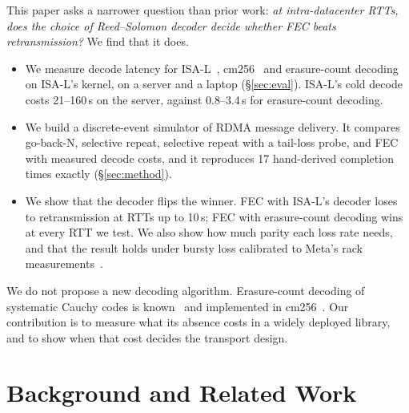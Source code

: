 \documentclass[10pt,twocolumn]{article}
\begin{document}
This paper asks a narrower question than prior work: \emph{at intra-datacenter RTTs, does the choice
of Reed--Solomon decoder decide whether FEC beats retransmission?} We find that it does.
\begin{itemize}
  \item We measure decode latency for ISA-L~\cite{isal}, cm256~\cite{cm256} and erasure-count
        decoding~\cite{li2005patent,samsung2015cauchy} on ISA-L's kernel, on a server and a laptop
        (\S\ref{sec:eval}). ISA-L's cold decode costs 21--160\,\textmu s on the server, against
        0.8--3.4\,\textmu s for erasure-count decoding.
  \item We build a discrete-event simulator of RDMA message delivery. It compares go-back-N,
        selective repeat, selective repeat with a tail-loss probe, and FEC with measured decode
        costs, and it reproduces 17 hand-derived completion times exactly (\S\ref{sec:method}).
  \item We show that the decoder flips the winner. FEC with ISA-L's decoder loses to retransmission
        at RTTs up to 10\,\textmu s; FEC with erasure-count decoding wins at every RTT we test.
        We also show how much parity each loss rate needs, and that the result holds under
        bursty loss calibrated to Meta's rack measurements~\cite{ghabashneh2022}.
\end{itemize}
We do not propose a new decoding algorithm. Erasure-count decoding of systematic Cauchy codes is
known~\cite{li2005patent,samsung2015cauchy,versfeld2008,didier2009} and implemented in
cm256~\cite{cm256}. Our contribution is to measure what its absence costs in a widely deployed
library, and to show when that cost decides the transport design.

\section{Background and Related Work}
\label{sec:background}
\end{document}
